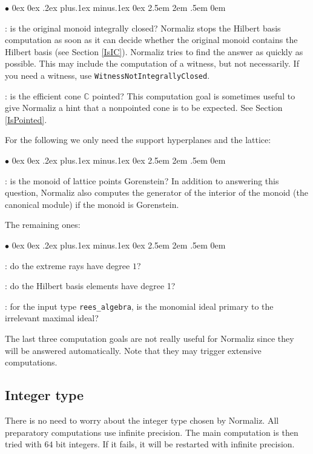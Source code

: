 \documentclass[12pt,a4paper]{scrartcl}
\newcommand{\stdli}{ \topsep0ex \partopsep0ex %
\parsep.2ex plus.1ex minus.1ex \itemsep0ex%
\leftmargin2.5em \labelwidth2em \labelsep.5em \rightmargin0em}%
\renewenvironment{itemize}{\begin{list}{{$\bullet$}}{\stdli}}{\end{list}}
\theoremstyle{definition}
\def\CC{{\mathbb C}}
\def\itemtt[#1]{\item[\textbf{\ttt{#1}}]}
\def\ttt{\texttt}
\begin{document}
\begin{itemize}
	\itemtt[IsIntegrallyClosed, -w]: is the original monoid integrally closed? Normaliz stops the Hilbert basis computation as soon as it can decide whether the original monoid contains the Hilbert basis (see Section \ref{IsIC}). Normaliz tries to find the answer as quickly as possible. This may include the computation of a witness, but not necessarily. If you need a witness, use \verb|WitnessNotIntegrallyClosed|.
	
	\itemtt[IsPointed]: is the efficient cone $\CC$ pointed? This computation goal is sometimes useful to give Normaliz a hint that a nonpointed cone is to be expected. See Section \ref{IsPointed}.
\end{itemize}

For the following we only need the support hyperplanes and the lattice:

\begin{itemize}
	\itemtt[IsGorenstein, -G]: is the monoid of lattice points Gorenstein? In addition to answering this question, Normaliz also computes the generator of the interior of the monoid (the canonical module) if the monoid is Gorenstein.
\end{itemize}

The remaining ones:

\begin{itemize}
	
	\itemtt[IsDeg1ExtremeRays]: do the extreme rays have degree $1$?
	
	\itemtt[IsDeg1HilbertBasis]: do the Hilbert basis elements have degree 1?
	
	\itemtt[IsReesPrimary]: for the input type \verb|rees_algebra|, is the monomial ideal primary to the irrelevant maximal ideal?
	
\end{itemize}

The last three computation goals are not really useful for Normaliz since they will be answered automatically. Note that they may trigger extensive computations.

\subsection{Integer type}\label{Integer}

There is no need to worry about the integer type chosen by Normaliz. All preparatory computations use infinite precision. The main computation is then tried with $64$ bit integers. If it fails, it will be restarted with infinite precision.
\end{document}
